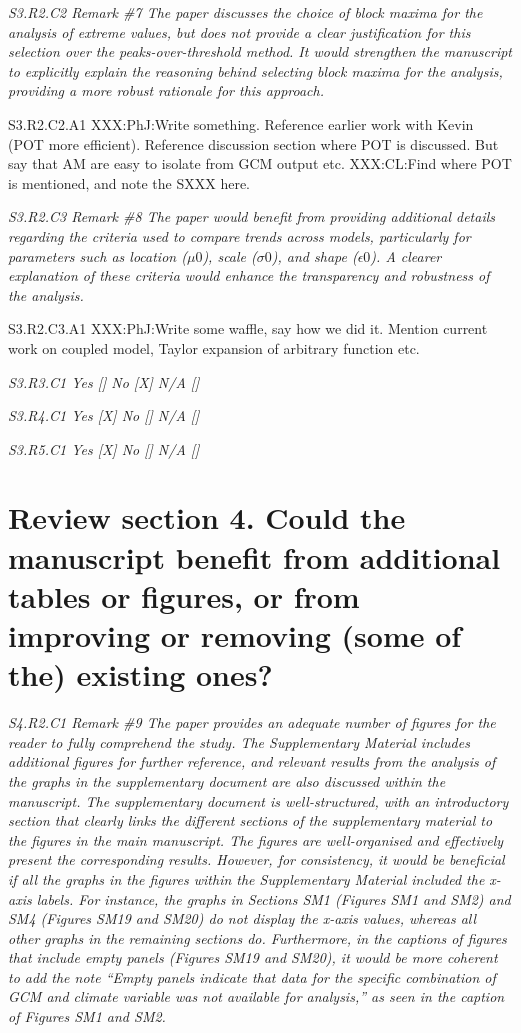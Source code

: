 \documentclass[a4paper,10pt]{article}
\begin{document}
	\emph{S3.R2.C2 Remark \#7 The paper discusses the choice of block maxima for the analysis of extreme values, but does not provide a clear justification for this selection over the peaks-over-threshold method. It would strengthen the manuscript to explicitly explain the reasoning behind selecting block maxima for the analysis, providing a more robust rationale for this approach.}
	
	S3.R2.C2.A1 XXX:PhJ:Write something. Reference earlier work with Kevin (POT more efficient). Reference discussion section where POT is discussed. But say that AM are easy to isolate from GCM output etc. XXX:CL:Find where POT is mentioned, and note the SXXX here.
	
	\emph{S3.R2.C3 Remark \#8 The paper would benefit from providing additional details regarding the criteria used to compare trends across models, particularly for parameters such as location ($\mu0$), scale ($\sigma0$), and shape ($\epsilon0$). A clearer explanation of these criteria would enhance the transparency and robustness of the analysis.}
	
	S3.R2.C3.A1 XXX:PhJ:Write some waffle, say how we did it. Mention current work on coupled model, Taylor expansion of arbitrary function etc.
	
	\emph{S3.R3.C1 Yes [] No [X] N/A []}
	
	\emph{S3.R4.C1 Yes [X] No [] N/A []}
	
	\emph{S3.R5.C1 Yes [X] No [] N/A []}

	\section*{Review section 4. Could the manuscript benefit from additional tables or figures, or from improving or removing (some of the) existing ones?}

	\emph{S4.R2.C1 Remark \#9 The paper provides an adequate number of figures for the reader to fully comprehend the study. The Supplementary Material includes additional figures for further reference, and relevant results from the analysis of the graphs in the supplementary document are also discussed within the manuscript. The supplementary document is well-structured, with an introductory section that clearly links the different sections of the supplementary material to the figures in the main manuscript. The figures are well-organised and effectively present the corresponding results. However, for consistency, it would be beneficial if all the graphs in the figures within the Supplementary Material included the x-axis labels. For instance, the graphs in Sections SM1 (Figures SM1 and SM2) and SM4 (Figures SM19 and SM20) do not display the x-axis values, whereas all other graphs in the remaining sections do. Furthermore, in the captions of figures that include empty panels (Figures SM19 and SM20), it would be more coherent to add the note “Empty panels indicate that data for the specific combination of GCM and climate variable was not available for analysis,” as seen in the caption of Figures SM1 and SM2.}
\end{document}

